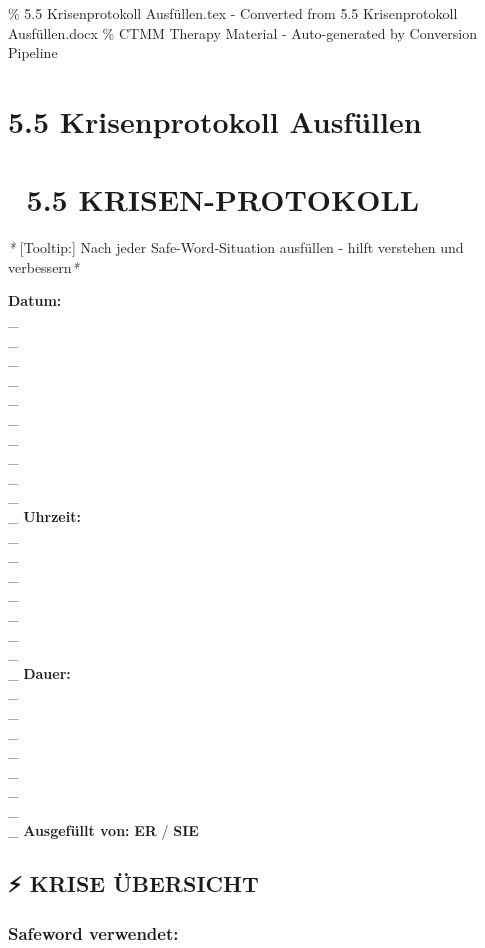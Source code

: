 \% 5.5 Krisenprotokoll Ausfüllen.tex - Converted from 5.5 Krisenprotokoll Ausfüllen.docx
\% CTMM Therapy Material - Auto-generated by Conversion Pipeline

\section{5.5 Krisenprotokoll Ausfüllen}
\label{sec:5-5-krisenprotokoll-ausf-llen}

\section{\textbf{🚨 5.5 KRISEN-PROTOKOLL}}

\textit{*}\textcolor{ctmmYellow}{} [Tooltip:] Nach jeder Safe-Word-Situation ausfüllen -
hilft verstehen und verbessern\textit{*}

\textbf{Datum:} \\\_\\\_\\\_\\\_\\\_\\\_\\\_\\\_\\\_\\\_\\\_ \textbf{Uhrzeit:} \\\_\\\_\\\_\\\_\\\_\\\_\\\_\\\_
\textbf{Dauer:} \\\_\\\_\\\_\\\_\\\_\\\_\\\_\\\_ \textbf{Ausgefüllt von:} \textbf{ER} / \textbf{SIE}

\subsection{\textbf{⚡ KRISE ÜBERSICHT}}

\subsubsection{\textbf{Safeword verwendet:}}

